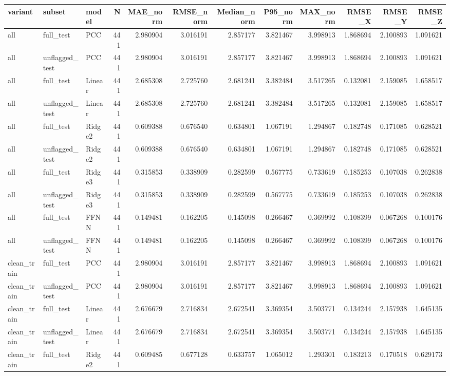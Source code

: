 \begin{tabular}{lllrrrrrrrrr}
\toprule
variant & subset & model & N & MAE_norm & RMSE_norm & Median_norm & P95_norm & MAX_norm & RMSE_X & RMSE_Y & RMSE_Z \\
\midrule
all & full_test & PCC & 441 & 2.980904 & 3.016191 & 2.857177 & 3.821467 & 3.998913 & 1.868694 & 2.100893 & 1.091621 \\
all & unflagged_test & PCC & 441 & 2.980904 & 3.016191 & 2.857177 & 3.821467 & 3.998913 & 1.868694 & 2.100893 & 1.091621 \\
all & full_test & Linear & 441 & 2.685308 & 2.725760 & 2.681241 & 3.382484 & 3.517265 & 0.132081 & 2.159085 & 1.658517 \\
all & unflagged_test & Linear & 441 & 2.685308 & 2.725760 & 2.681241 & 3.382484 & 3.517265 & 0.132081 & 2.159085 & 1.658517 \\
all & full_test & Ridge2 & 441 & 0.609388 & 0.676540 & 0.634801 & 1.067191 & 1.294867 & 0.182748 & 0.171085 & 0.628521 \\
all & unflagged_test & Ridge2 & 441 & 0.609388 & 0.676540 & 0.634801 & 1.067191 & 1.294867 & 0.182748 & 0.171085 & 0.628521 \\
all & full_test & Ridge3 & 441 & 0.315853 & 0.338909 & 0.282599 & 0.567775 & 0.733619 & 0.185253 & 0.107038 & 0.262838 \\
all & unflagged_test & Ridge3 & 441 & 0.315853 & 0.338909 & 0.282599 & 0.567775 & 0.733619 & 0.185253 & 0.107038 & 0.262838 \\
all & full_test & FFNN & 441 & 0.149481 & 0.162205 & 0.145098 & 0.266467 & 0.369992 & 0.108399 & 0.067268 & 0.100176 \\
all & unflagged_test & FFNN & 441 & 0.149481 & 0.162205 & 0.145098 & 0.266467 & 0.369992 & 0.108399 & 0.067268 & 0.100176 \\
clean_train & full_test & PCC & 441 & 2.980904 & 3.016191 & 2.857177 & 3.821467 & 3.998913 & 1.868694 & 2.100893 & 1.091621 \\
clean_train & unflagged_test & PCC & 441 & 2.980904 & 3.016191 & 2.857177 & 3.821467 & 3.998913 & 1.868694 & 2.100893 & 1.091621 \\
clean_train & full_test & Linear & 441 & 2.676679 & 2.716834 & 2.672541 & 3.369354 & 3.503771 & 0.134244 & 2.157938 & 1.645135 \\
clean_train & unflagged_test & Linear & 441 & 2.676679 & 2.716834 & 2.672541 & 3.369354 & 3.503771 & 0.134244 & 2.157938 & 1.645135 \\
clean_train & full_test & Ridge2 & 441 & 0.609485 & 0.677128 & 0.633757 & 1.065012 & 1.293301 & 0.183213 & 0.170518 & 0.629173 \\

\end{tabular}
